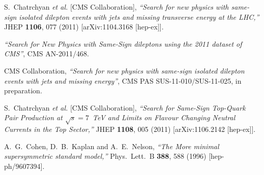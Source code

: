 \begin{thebibliography}{99}




  S.~Chatrchyan {\it et al.}  [CMS Collaboration],
  {\it ``Search for new physics with same-sign isolated dilepton 
	events with jets and missing transverse energy at the LHC,''}
  JHEP {\bf 1106}, 077 (2011)
  [arXiv:1104.3168 [hep-ex]].

 {{\it ``Search for New Physics with Same-Sign dileptons using the 2011 dataset of CMS''}}, 
  CMS AN-2011/468.

 CMS Collaboration, {{\it ``Search for new physics with same-sign isolated 
	dilepton events with jets and missing energy''}}, 
  CMS PAS SUS-11-010/SUS-11-025, in preparation.

  S.~Chatrchyan {\it et al.}  [CMS Collaboration],
  {\it ``Search for Same-Sign Top-Quark Pair Production at $\sqrt{s} = 7$~TeV 
	and Limits on Flavour Changing Neutral Currents in the Top Sector,''}
  JHEP {\bf 1108}, 005 (2011)
  [arXiv:1106.2142 [hep-ex]].















  A.~G.~Cohen, D.~B.~Kaplan and A.~E.~Nelson,
  {\it ``The More minimal supersymmetric standard model,''}
  Phys.\ Lett.\ B {\bf 388}, 588 (1996)
  [hep-ph/9607394].



\end{thebibliography}
